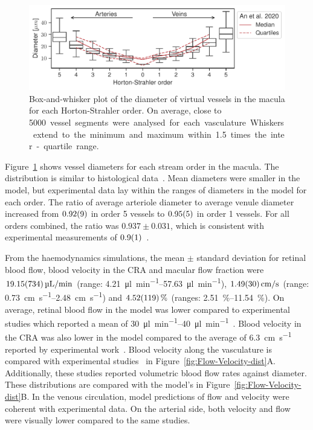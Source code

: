\documentclass[11pt,]{article}
\begin{document}
\begin{figure}[ht!]
  \centering
  \includegraphics[width=.95\textwidth]{Horton_Strahler_Diameter_Distribution}
  \caption{\label{fig:Horton_Strahler}Box-and-whisker plot of the diameter of virtual vessels in the macula for each Horton-Strahler order. On average, close to \SI{5000} vessel segments were analysed for each vasculature. Whiskers extend to the minimum and maximum within \SI{1.5}{} times the inter-quartile range.}  
\end{figure}

Figure~\ref{fig:Horton_Strahler} shows vessel diameters for each stream order in the macula.
The distribution is similar to histological data~\cite{An2020}.
Mean diameters were smaller in the model, but experimental data lay within the ranges of diameters in the model for each order.
The ratio of average arteriole diameter to average venule diameter increased from $\SI{0.92\pm 0.09}{}$ in order 5 vessels to $\SI{0.95\pm0.05}{}$ in order 1 vessels.
For all orders combined, the ratio was $0.937\pm0.031$, which is consistent with experimental measurements of $\SI{0.9\pm0.1}{}$~\cite{Goldenberg2013}.  

From the haemodynamics simulations, the mean $\pm$ standard deviation for retinal blood flow, blood velocity in the CRA and macular flow fraction were $\SI[per-mode=symbol]{19.15\pm7.34}{\micro\litre\per\minute}$ (range: \SIrange[per-mode=symbol]{4.21}{57.63}{\micro\litre\per\minute}), $\SI[per-mode=symbol]{1.49\pm0.30}{\cm\per\second}$ (range: \SIrange[per-mode=symbol]{0.73}{2.48}{\cm\per\second}) and $\SI{4.52\pm1.19}{\percent}$ (ranges: \SIrange{2.51}{11.54}{\percent}).
On average, retinal blood flow in the model was lower compared to experimental studies which reported a mean of \SIrange{30}{40}{\micro\litre\per\minute}~\cite{DoblhoffDier2014,Riva1985}.
Blood velocity in the CRA was also lower in the model compared to the average of \SI{6.3}{\cm\per\second} reported by experimental work~\cite{Dorner2009}.
Blood velocity along the vasculature is compared with experimental studies~\cite{DoblhoffDier2014,Riva1985} in Figure~\ref{fig:Flow-Velocity-dist}A.
Additionally, these studies reported volumetric blood flow rates against diameter.
These distributions are compared with the model's in Figure~\ref{fig:Flow-Velocity-dist}B.
In the venous circulation, model predictions of flow and velocity were coherent with experimental data.
On the arterial side, both velocity and flow were visually lower compared to the same studies.
\end{document}
